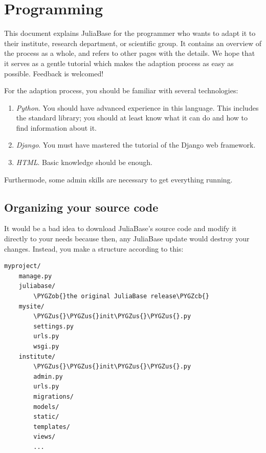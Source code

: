 \documentclass[a4paper,11pt,english]{sphinxmanual}
\def\PYGZus{\char`\_}
\def\PYGZob{\char`\{}
\def\PYGZcb{\char`\}}
\begin{document}

\chapter{Programming}
\label{programming/programming:index-0}\label{programming/programming::doc}\label{programming/programming:programming}
This document explains JuliaBase for the programmer who wants to adapt it to
their institute, research department, or scientific group.  It contains an
overview of the process as a whole, and refers to other pages with the details.
We hope that it serves as a gentle tutorial which makes the adaption process as
easy as possible.  Feedback is welcomed!

For the adaption process, you should be familiar with several technologies:
\begin{enumerate}
\item {} 
\emph{Python}.  You should have advanced experience in this language.  This
includes the standard library; you should at least know what it can do and
how to find information about it.

\item {} 
\emph{Django}.  You must have mastered the tutorial of the Django web framework.

\item {} 
\emph{HTML}.  Basic knowledge should be enough.

\end{enumerate}

Furthermode, some admin skills are necessary to get everything running.


\section{Organizing your source code}
\label{programming/programming:organizing-your-source-code}\label{programming/programming:index-1}\label{programming/programming:id1}
It would be a bad idea to download JuliaBase's source code and modify it
directly to your needs because then, any JuliaBase update would destroy your
changes.  Instead, you make a structure according to this:

\begin{Verbatim}[commandchars=\\\{\},formatcom=\scriptsize]
myproject/
    manage.py
    juliabase/
        \PYGZob{}the original JuliaBase release\PYGZcb{}
    mysite/
        \PYGZus{}\PYGZus{}init\PYGZus{}\PYGZus{}.py
        settings.py
        urls.py
        wsgi.py
    institute/
        \PYGZus{}\PYGZus{}init\PYGZus{}\PYGZus{}.py
        admin.py
        urls.py
        migrations/
        models/
        static/
        templates/
        views/
        ...
\end{Verbatim}
\end{document}
